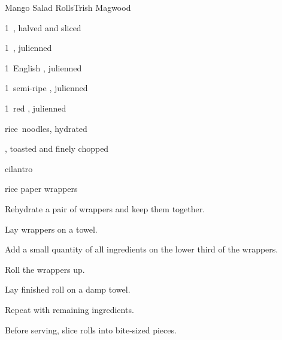 \begin{recipe}{Mango Salad Rolls}{Trish Magwood}{}

\begin{ingredients}
\item 1~, halved and sliced
\item 1~, julienned
\item 1~English , julienned
\item 1~semi-ripe , julienned
\item 1~red , julienned
\item {} rice~noodles, hydrated
\item \C{\half} , toasted and finely chopped
\item cilantro
\item rice paper wrappers
\end{ingredients}

\begin{directions}
\item Rehydrate a pair of wrappers and keep them together.
\item Lay wrappers on a towel.
\item Add a small quantity of all ingredients on the lower third of the wrappers.
\item Roll the wrappers up.
\item Lay finished roll on a damp towel.
\item Repeat with remaining ingredients.
\item Before serving, slice rolls into bite-sized pieces.
\end{directions}

\end{recipe}
